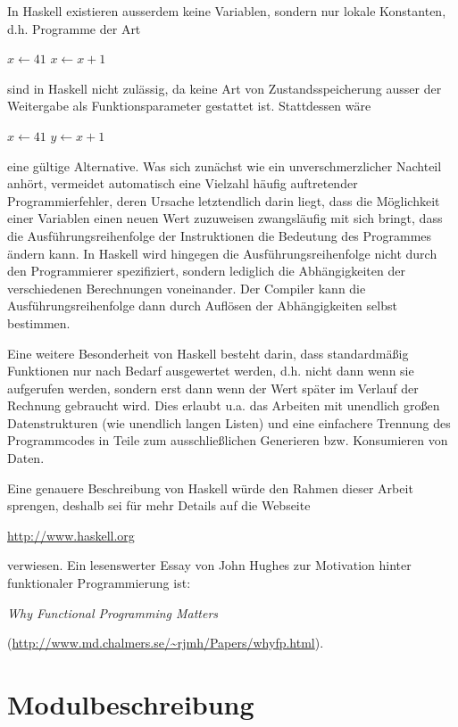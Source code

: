 	In Haskell existieren ausserdem keine Variablen, sondern nur lokale Konstanten, d.h. Programme der Art
		\begin{algorithmic}
			\STATE $x\leftarrow 41$
			\STATE $x\leftarrow x+1$
		\end{algorithmic}
	sind in Haskell nicht zulässig, da keine Art von Zustandsspeicherung ausser der Weitergabe als Funktionsparameter gestattet ist. Stattdessen wäre
		\begin{algorithmic}
			\STATE $x\leftarrow 41$
			\STATE $y\leftarrow x+1$
		\end{algorithmic}
	eine gültige Alternative. Was sich zunächst wie ein unverschmerzlicher Nachteil anhört, vermeidet automatisch eine Vielzahl häufig auftretender Programmierfehler, deren Ursache letztendlich darin liegt, dass die Möglichkeit einer Variablen einen neuen Wert zuzuweisen zwangsläufig mit sich bringt, dass die Ausführungsreihenfolge der Instruktionen die Bedeutung des Programmes ändern kann. In Haskell wird hingegen die Ausführungsreihenfolge nicht durch den Programmierer spezifiziert, sondern lediglich die Abhängigkeiten der verschiedenen Berechnungen voneinander. Der Compiler kann die Ausführungsreihenfolge dann durch Auflösen der Abhängigkeiten selbst bestimmen.
	
	Eine weitere Besonderheit von Haskell besteht darin, dass standardmäßig Funktionen nur nach Bedarf ausgewertet werden, d.h. nicht dann wenn sie aufgerufen werden, sondern erst dann wenn der Wert später im Verlauf der Rechnung gebraucht wird. Dies erlaubt u.a. das Arbeiten mit unendlich großen Datenstrukturen (wie unendlich langen Listen) und eine einfachere Trennung des  Programmcodes in Teile zum ausschließlichen Generieren bzw. Konsumieren von Daten.
		
	Eine genauere Beschreibung von Haskell würde den Rahmen dieser Arbeit sprengen, deshalb sei für mehr Details auf die Webseite
	
	\url{http://www.haskell.org}
	
	verwiesen. Ein lesenswerter Essay von John Hughes zur Motivation hinter funktionaler Programmierung ist:
	
	{\em Why Functional Programming Matters}
	
	(\url{http://www.md.chalmers.se/~rjmh/Papers/whyfp.html}).
	
	
	\section{Modulbeschreibung}
	
	
	
	
	